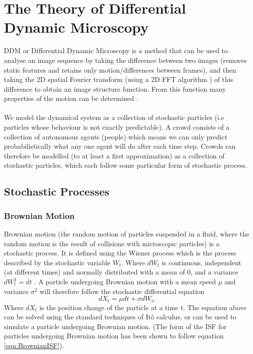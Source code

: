 \documentclass[10pt]{article}
\begin{document}
\section{The Theory of Differential Dynamic Microscopy}
\label{section:theory}
DDM or Differential Dynamic Microscopy is a method that can be used to analyse an image sequence by taking the difference between two images (removes static features and retains only motion/differences between frames), and then taking the 2D spatial Fourier transform (using a 2D FFT algorithm \cite{fft}) of this difference to obtain an image structure function.
From this function many properties of the motion can be determined \cite{ddm1}. 
\\\\
We model the dynamical system as a collection of stochastic particles (i.e particles whose behaviour is not exactly predictable). A crowd consists of a collection of autonomous agents (people) which means we can only predict probabilistically what any one agent will do after each time step. Crowds can therefore be modelled (to at least a first approximation) as a collection of stochastic particles, which each follow some particular form of stochastic process.

\subsection{Stochastic Processes}
\subsubsection{Brownian Motion}
Brownian motion (the random motion of particles suspended in a fluid, where the random motion is the result of collisions with microscopic particles) is a stochastic process. It is defined using the Wiener process which is the process described by the stochastic variable $W_t$. Where $dW_t$ is continuous, independent (at different times) and normally distributed with a mean of 0, and a variance $dW_t^2 = dt$ \cite{sde}. A particle undergoing Brownian motion with a mean speed $\mu$ and variance $\sigma^2$ will therefore follow the stochastic differential equation
\begin{equation}
\label{eqn:brownianSDE}
dX_t = \mu dt + \sigma dW_t.
\end{equation}
Where $dX_t$ is the position change of the particle at a time t. The equation above can be solved using the standard techniques of Itô calculus, or can be used to simulate a particle undergoing Brownian motion. (The form of the ISF for particles undergoing Brownian motion has been shown to follow equation \ref{eqn:BrownianISF}).
\end{document}
